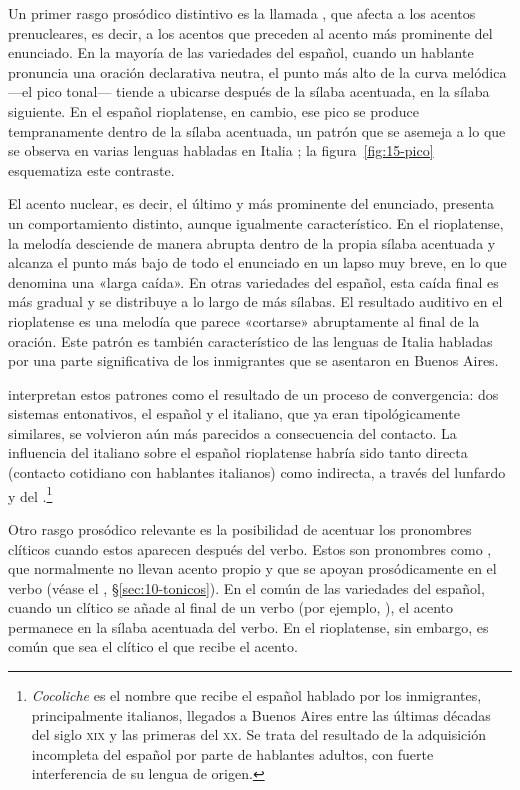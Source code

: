 Un primer rasgo prosódico distintivo es la llamada , que afecta a los acentos prenucleares, es decir, a los acentos
que preceden al acento más prominente del enunciado. En la mayoría de las
variedades del español, cuando un hablante pronuncia una oración declarativa
neutra, el punto más alto de la curva melódica ---el pico tonal--- tiende a
ubicarse después de la sílaba acentuada, en la sílaba siguiente. En el español
rioplatense, en cambio, ese pico se produce tempranamente dentro de la sílaba
acentuada, un patrón que se asemeja a lo que se observa en varias lenguas
habladas en Italia \parencite{colantoni2004}; la figura~\ref{fig:15-pico}
esquematiza este contraste.


El acento nuclear, es decir, el último y más prominente del enunciado, presenta
un comportamiento distinto, aunque igualmente característico. En el rioplatense,
la melodía desciende de manera abrupta dentro de la propia sílaba acentuada y
alcanza el punto más bajo de todo el enunciado en un lapso muy breve, en lo que
\textcite{kaisse2001} denomina una «larga caída». En otras variedades del
español, esta caída final es más gradual y se distribuye a lo largo de más
sílabas. El resultado auditivo en el rioplatense es una melodía que parece
«cortarse» abruptamente al final de la oración. Este patrón es también
característico de las lenguas de Italia habladas por una parte significativa de
los inmigrantes que se asentaron en Buenos Aires.

\textcite{colantoni2004} interpretan estos patrones como el resultado de un
proceso de convergencia: dos sistemas entonativos, el español y el italiano, que
ya eran tipológicamente similares, se volvieron aún más parecidos a consecuencia
del contacto. La influencia del italiano sobre el español rioplatense habría sido
tanto directa (contacto cotidiano con hablantes italianos) como indirecta, a
través del lunfardo y del .\footnote{\textit{Cocoliche} es el
nombre que recibe el español hablado por los inmigrantes, principalmente
italianos, llegados a Buenos Aires entre las últimas décadas del siglo
\textsc{xix} y las primeras del \textsc{xx}. Se trata del resultado de la
adquisición incompleta del español por parte de hablantes adultos, con fuerte
interferencia de su lengua de origen.}

Otro rasgo prosódico relevante es la posibilidad de acentuar los pronombres
clíticos cuando estos aparecen después del verbo. Estos son pronombres como
, que normalmente no llevan acento propio y que se apoyan
prosódicamente en el verbo (véase el , §\ref{sec:10-tonicos}). En el
común de las variedades del español, cuando un clítico se añade al final de un
verbo (por ejemplo, ), el acento permanece en la sílaba
acentuada del verbo. En el rioplatense, sin embargo, es común que sea el clítico
el que recibe el acento.

